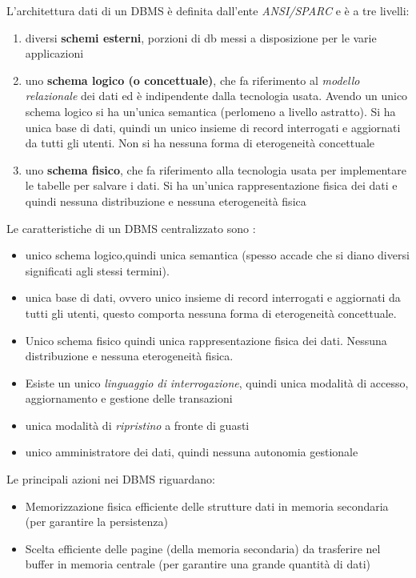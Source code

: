 L'architettura dati di un DBMS è definita dall'ente \textit{ANSI/SPARC} 
e è a tre livelli:
\begin{enumerate}
  \item diversi \textbf{schemi esterni}, porzioni di db messi a disposizione per
  le varie applicazioni
  \item uno \textbf{schema logico (o concettuale)}, che fa riferimento al
  \textit{modello relazionale} dei dati ed è indipendente dalla tecnologia
  usata. Avendo un unico schema logico si ha un'unica semantica (perlomeno a
  livello astratto). Si ha unica base di dati, quindi un unico insieme di record
  interrogati e aggiornati da tutti gli utenti. Non si ha nessuna forma di
  eterogeneità concettuale 
  \item uno \textbf{schema fisico}, che fa riferimento alla tecnologia usata per
  implementare le tabelle per salvare i dati. Si ha un'unica rappresentazione
  fisica dei dati e quindi nessuna distribuzione e nessuna eterogeneità fisica
\end{enumerate}

Le caratteristiche di un DBMS centralizzato sono :
\begin{itemize}
    \item unico schema logico,quindi unica semantica (spesso accade che si diano diversi significati agli stessi termini).
    \item unica base di dati, ovvero unico insieme di record interrogati e aggiornati da tutti gli utenti, questo comporta nessuna forma di eterogeneità concettuale.
    \item Unico schema fisico quindi unica rappresentazione fisica dei dati. Nessuna distribuzione e nessuna eterogeneità fisica.
    \item Esiste un unico \textit{linguaggio di interrogazione}, quindi unica modalità di accesso, aggiornamento e gestione delle transazioni
    \item unica modalità di \textit{ripristino} a fronte di guasti 
    \item unico amministratore dei dati, quindi nessuna autonomia gestionale 
\end{itemize}

Le principali azioni nei DBMS riguardano:
\begin{itemize}
    \item Memorizzazione fisica efficiente delle strutture dati in memoria secondaria (per  garantire la persistenza)
    \item Scelta efficiente delle pagine (della memoria secondaria) da trasferire nel buffer in memoria centrale (per garantire una grande quantità di dati)
\end{itemize}

